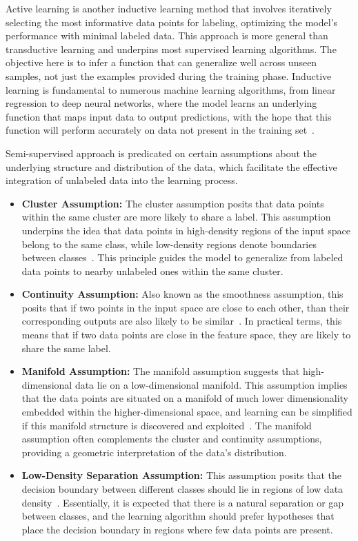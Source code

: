 Active learning is another inductive learning method that involves iteratively selecting the most informative data points for labeling, optimizing the model's performance with minimal labeled data.
This approach is more general than transductive learning and underpins most supervised learning algorithms.
The objective here is to infer a function that can generalize well across unseen samples, not just the examples provided during the training phase.
Inductive learning is fundamental to numerous machine learning algorithms, from linear regression to deep neural networks, where the model learns an underlying function that maps input data to output predictions, with the hope that this function will perform accurately on data not present in the training set~\cite{mitchell1997machine}.

Semi-supervised approach is predicated on certain assumptions about the underlying structure and distribution of the data, which facilitate the effective integration of unlabeled data into the learning process.
\begin{itemize}
	\item \textbf{Cluster Assumption:} {The cluster assumption posits that data points within the same cluster are more likely to share a label. This assumption underpins the idea that data points in high-density regions of the input space belong to the same class, while low-density regions denote boundaries between classes~\cite{chapelle2009semi}. This principle guides the model to generalize from labeled data points to nearby unlabeled ones within the same cluster.}
	\item \textbf{Continuity Assumption:} {Also known as the smoothness assumption, this posits that if two points in the input space are close to each other, than their corresponding outputs are also likely to be similar~\cite{zhou2004learning}. In practical terms, this means that if two data points are close in the feature space, they are likely to share the same label.}
	\item \textbf{Manifold Assumption:} {The manifold assumption suggests that high-dimensional data lie on a low-dimensional manifold. This assumption implies that the data points are situated on a manifold of much lower dimensionality embedded within the higher-dimensional space, and learning can be simplified if this manifold structure is discovered and exploited~\cite{belkin2006manifold}. The manifold assumption often complements the cluster and continuity assumptions, providing a geometric interpretation of the data's distribution.}
	\item \textbf{Low-Density Separation Assumption:} {This assumption posits that the decision boundary between different classes should lie in regions of low data density~\cite{chapelle2009semi}. Essentially, it is expected that there is a natural separation or gap between classes, and the learning algorithm should prefer hypotheses that place the decision boundary in regions where few data points are present.}
\end{itemize}

